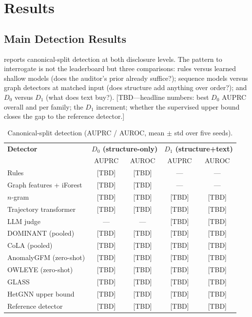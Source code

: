\section{Results}
\label{sec:results}

\subsection{Main Detection Results}
\label{sec:results-main}

 reports canonical-split detection at both disclosure levels. The pattern to interrogate is not the leaderboard but three comparisons: rules versus learned shallow models (does the auditor's prior already suffice?); sequence models versus graph detectors at matched input (does structure add anything over order?); and $D_0$ versus $D_1$ (what does text buy?). [TBD---headline numbers: best $D_0$ AUPRC overall and per family; the $D_1$ increment; whether the supervised upper bound closes the gap to the reference detector.]

\begin{table}[tb]
  \centering
  \caption{Canonical-split detection (AUPRC / AUROC, mean $\pm$ std over five seeds).}
  \label{tab:main}
  \begin{small}
  \begin{tabular}{lcccc}
    \toprule
    \textbf{Detector} & \multicolumn{2}{c}{\textbf{$D_0$ (structure-only)}} & \multicolumn{2}{c}{\textbf{$D_1$ (structure+text)}} \\
     & AUPRC & AUROC & AUPRC & AUROC \\
    \midrule
    Rules & [TBD] & [TBD] & --- & --- \\
    Graph features + iForest & [TBD] & [TBD] & --- & --- \\
    $n$-gram & [TBD] & [TBD] & [TBD] & [TBD] \\
    Trajectory transformer & [TBD] & [TBD] & [TBD] & [TBD] \\
    LLM judge & --- & --- & [TBD] & [TBD] \\
    DOMINANT (pooled) & [TBD] & [TBD] & [TBD] & [TBD] \\
    CoLA (pooled) & [TBD] & [TBD] & [TBD] & [TBD] \\
    AnomalyGFM (zero-shot) & [TBD] & [TBD] & [TBD] & [TBD] \\
    OWLEYE (zero-shot) & [TBD] & [TBD] & [TBD] & [TBD] \\
    GLASS & [TBD] & [TBD] & [TBD] & [TBD] \\
    HetGNN upper bound & [TBD] & [TBD] & [TBD] & [TBD] \\
    Reference detector & [TBD] & [TBD] & [TBD] & [TBD] \\
    \bottomrule
  \end{tabular}
  \end{small}
\end{table}

